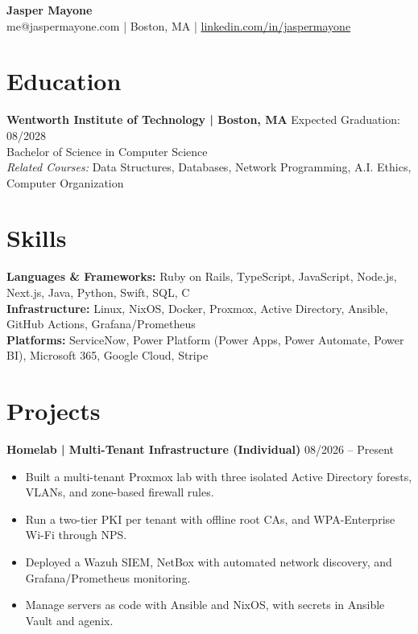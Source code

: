\documentclass[10pt,letterpaper]{article}
\begin{document}
\begin{center}
    {\LARGE \textbf{Jasper Mayone}} \\[2pt]
    me@jaspermayone.com | Boston, MA | \href{https://linkedin.com/in/jaspermayone}{linkedin.com/in/jaspermayone}
\end{center}

\vspace{-2pt}

\section{Education}
\noindent
\textbf{Wentworth Institute of Technology | Boston, MA} \hfill Expected Graduation: 08/2028 \\
Bachelor of Science in Computer Science \\[6pt]
\textit{Related Courses:} Data Structures, Databases, Network Programming, A.I. Ethics, Computer Organization

\vspace{2pt}

\section{Skills}
\noindent
\textbf{Languages \& Frameworks:} Ruby on Rails, TypeScript, JavaScript, Node.js, Next.js, Java, Python, Swift, SQL, C \\
\textbf{Infrastructure:} Linux, NixOS, Docker, Proxmox, Active Directory, Ansible, GitHub Actions, Grafana/Prometheus \\
\textbf{Platforms:} ServiceNow, Power Platform (Power Apps, Power Automate, Power BI), Microsoft 365, Google Cloud, Stripe

\vspace{2pt}

\section{Projects}
\noindent
\textbf{Homelab | Multi-Tenant Infrastructure (Individual)} \hfill 08/2026 -- Present
\begin{itemize}
    \item Built a multi-tenant Proxmox lab with three isolated Active Directory forests, VLANs, and zone-based firewall rules.
    \item Run a two-tier PKI per tenant with offline root CAs, and WPA-Enterprise Wi-Fi through NPS.
    \item Deployed a Wazuh SIEM, NetBox with automated network discovery, and Grafana/Prometheus monitoring.
    \item Manage servers as code with Ansible and NixOS, with secrets in Ansible Vault and agenix.
\end{itemize}
\end{document}
